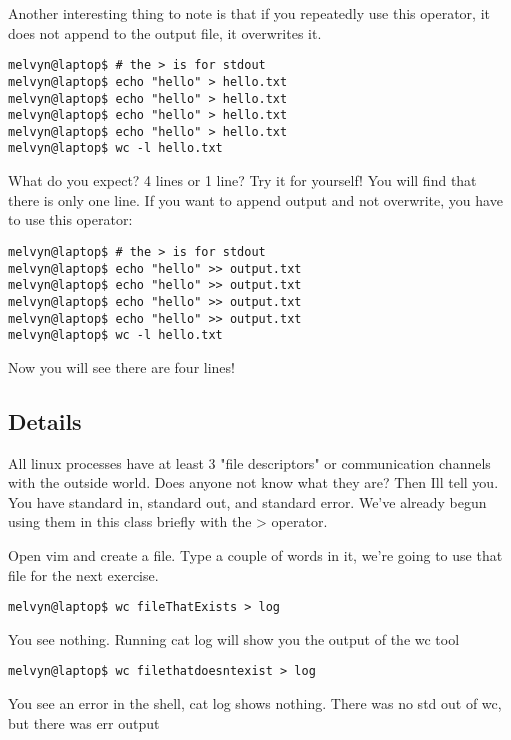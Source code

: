 \documentclass[12pt,a4paper]{article}
\begin{document}
Another interesting thing to note is that if you repeatedly use this operator,
it does not append to the output file, it overwrites it.

\begin{lstlisting}[style=term]
melvyn@laptop$ # the > is for stdout
melvyn@laptop$ echo "hello" > hello.txt
melvyn@laptop$ echo "hello" > hello.txt
melvyn@laptop$ echo "hello" > hello.txt
melvyn@laptop$ echo "hello" > hello.txt
melvyn@laptop$ wc -l hello.txt
\end{lstlisting} 

What do you expect? 4 lines or 1 line? Try it for yourself! You will find that
there is only one line. If you want to append output and not overwrite, you have
to use this operator:

\begin{lstlisting}[style=term]
melvyn@laptop$ # the > is for stdout
melvyn@laptop$ echo "hello" >> output.txt
melvyn@laptop$ echo "hello" >> output.txt
melvyn@laptop$ echo "hello" >> output.txt
melvyn@laptop$ echo "hello" >> output.txt
melvyn@laptop$ wc -l hello.txt
\end{lstlisting} 

Now you will see there are four lines!

\subsection*{Details}
All linux processes have at least 3 "file descriptors" or communication channels with the outside world. Does anyone not know what they are? Then Ill tell you. You have standard in, standard out, and standard error. We've already begun using them in this class briefly with the > operator. 

Open vim and create a file. Type a couple of words in it, we're going to use that file for the next exercise.

\begin{lstlisting}[style=term]
melvyn@laptop$ wc fileThatExists > log
\end{lstlisting}

 You see nothing. Running cat log will show you the output of the wc tool

\begin{lstlisting}[style=term]
melvyn@laptop$ wc filethatdoesntexist > log
\end{lstlisting}

 You see an error in the shell, cat log shows nothing. There was no std out of wc, but there was err output
\end{document}
